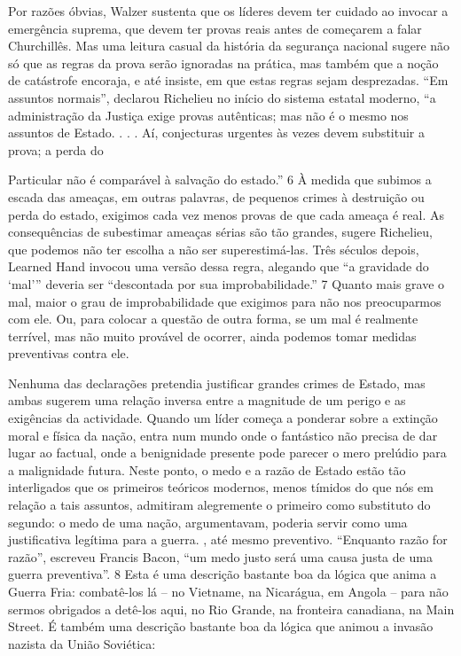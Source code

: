 Por razões óbvias, Walzer sustenta que os líderes devem ter cuidado ao invocar a emergência suprema, que devem ter provas reais antes de começarem a falar Churchillês. Mas uma leitura casual da história da segurança nacional sugere não só que as regras da prova serão ignoradas na prática, mas também que a noção de catástrofe encoraja, e até insiste, em que estas regras sejam desprezadas. “Em assuntos normais”, declarou Richelieu no início do sistema estatal moderno, “a administração da Justiça exige provas autênticas; mas não é o mesmo nos assuntos de Estado. . . . Aí, conjecturas urgentes às vezes devem substituir a prova; a perda do
 \par 
Particular não é comparável à salvação do estado.” {\color{blue}6} À medida que subimos a escada das ameaças, em outras palavras, de pequenos crimes à destruição ou perda do estado, exigimos cada vez menos provas de que cada ameaça é real. As consequências de subestimar ameaças sérias são tão grandes, sugere Richelieu, que podemos não ter escolha a não ser superestimá-las. Três séculos depois, Learned Hand invocou uma versão dessa regra, alegando que “a gravidade do ‘mal’” deveria ser “descontada por sua improbabilidade.” {\color{blue}7} Quanto mais grave o mal, maior o grau de improbabilidade que exigimos para não nos preocuparmos com ele. Ou, para colocar a questão de outra forma, se um mal é realmente terrível, mas não muito provável de ocorrer, ainda podemos tomar medidas preventivas contra ele.
 \par 
Nenhuma das declarações pretendia justificar grandes crimes de Estado, mas ambas sugerem uma relação inversa entre a magnitude de um perigo e as exigências da actividade. Quando um líder começa a ponderar sobre a extinção moral e física da nação, entra num mundo onde o fantástico não precisa de dar lugar ao factual, onde a benignidade presente pode parecer o mero prelúdio para a malignidade futura. Neste ponto, o medo e a razão de Estado estão tão interligados que os primeiros teóricos modernos, menos tímidos do que nós em relação a tais assuntos, admitiram alegremente o primeiro como substituto do segundo: o medo de uma nação, argumentavam, poderia servir como uma justificativa legítima para a guerra. , até mesmo preventivo. “Enquanto razão for razão”, escreveu Francis Bacon, “um medo justo será uma causa justa de uma guerra preventiva”. {\color{blue}8} Esta é uma descrição bastante boa da lógica que anima a Guerra Fria: combatê-los lá – no Vietname, na Nicarágua, em Angola – para não sermos obrigados a detê-los aqui, no Rio Grande, na fronteira canadiana, na Main Street. É também uma descrição bastante boa da lógica que animou a invasão nazista da União Soviética:
